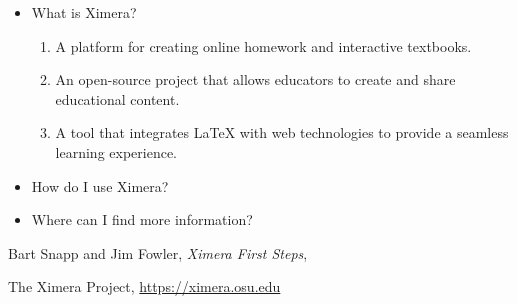 \documentclass{ximera}
\begin{document}
\begin{itemize}
    \item What is Ximera?
    \begin{enumerate}
        \item A platform for creating online homework and interactive textbooks.
        \item An open-source project that allows educators to create and share educational content.
        \item A tool that integrates LaTeX with web technologies to provide a seamless learning experience.
    \end{enumerate}
    \item How do I use Ximera?
    \item Where can I find more information?
\end{itemize}



\begin{thebibliography}{9}
    Bart Snapp and Jim Fowler,
    \textit{Ximera First Steps},
    
    The Ximera Project,
    \url{https://ximera.osu.edu}
\end{thebibliography}

\hrulefill
\end{document}
